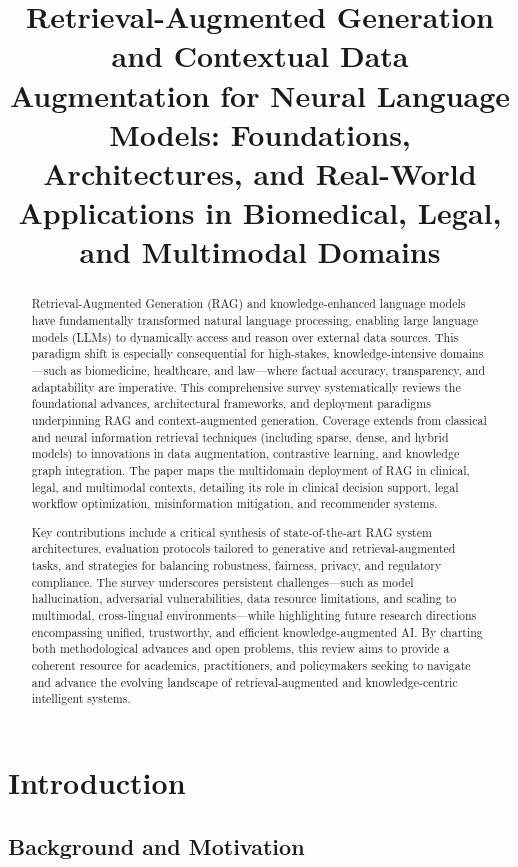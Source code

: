 \documentclass[sigconf]{acmart}
\title{Retrieval-Augmented Generation and Contextual Data Augmentation for Neural Language Models: Foundations, Architectures, and Real-World Applications in Biomedical, Legal, and Multimodal Domains}
\begin{document}
\begin{abstract}
Retrieval-Augmented Generation (RAG) and knowledge-enhanced language models have fundamentally transformed natural language processing, enabling large language models (LLMs) to dynamically access and reason over external data sources. This paradigm shift is especially consequential for high-stakes, knowledge-intensive domains—such as biomedicine, healthcare, and law—where factual accuracy, transparency, and adaptability are imperative. This comprehensive survey systematically reviews the foundational advances, architectural frameworks, and deployment paradigms underpinning RAG and context-augmented generation. Coverage extends from classical and neural information retrieval techniques (including sparse, dense, and hybrid models) to innovations in data augmentation, contrastive learning, and knowledge graph integration. The paper maps the multidomain deployment of RAG in clinical, legal, and multimodal contexts, detailing its role in clinical decision support, legal workflow optimization, misinformation mitigation, and recommender systems.

Key contributions include a critical synthesis of state-of-the-art RAG system architectures, evaluation protocols tailored to generative and retrieval-augmented tasks, and strategies for balancing robustness, fairness, privacy, and regulatory compliance. The survey underscores persistent challenges—such as model hallucination, adversarial vulnerabilities, data resource limitations, and scaling to multimodal, cross-lingual environments—while highlighting future research directions encompassing unified, trustworthy, and efficient knowledge-augmented AI. By charting both methodological advances and open problems, this review aims to provide a coherent resource for academics, practitioners, and policymakers seeking to navigate and advance the evolving landscape of retrieval-augmented and knowledge-centric intelligent systems.
\end{abstract}

\maketitle

\section{Introduction}

\subsection{Background and Motivation}
\end{document}
